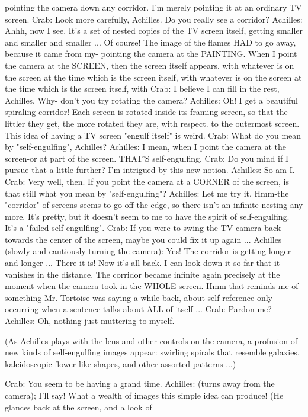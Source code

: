 {  pointing the camera down any corridor. I'm merely pointing it at an ordinary TV
  screen.
Crab: Look more carefully, Achilles. Do you really see a corridor?
Achilles: Ahhh, now I see. It's a set of nested copies of the TV screen itself, getting
  smaller and smaller and smaller ... Of course! The image of the flames HAD to go
  away, because it came from my- pointing the camera at the PAINTING. When I point
  the camera at the SCREEN, then the screen itself appears, with whatever is on the
  screen at the time which is the screen itself, with whatever is on the screen at the time
  which is the screen itself, with
Crab: I believe I can fill in the rest, Achilles. Why- don't you try rotating the camera?
Achilles: Oh! I get a beautiful spiraling corridor! Each screen is rotated inside its framing
  screen, so that the littler they get, the more rotated they are, with respect. to the
  outermost screen. This idea of having a TV screen "engulf itself" is weird.
Crab: What do you mean by "self-engulfing", Achilles?
Achilles: I mean, when I point the camera at the screen-or at part of the screen. THAT'S
  self-engulfing.
Crab: Do you mind if I pursue that a little further? I'm intrigued by this new notion.
Achilles: So am I.
Crab: Very well, then. If you point the camera at a CORNER of the screen, is that still
  what you mean by "self-engulfing"?
Achilles: Let me try it. Hmm-the "corridor" of screens seems to go off the edge, so there
  isn't an infinite nesting any more. It's pretty, but it doesn't seem to me to have the spirit
  of self-engulfing. It's a "failed self-engulfing".
Crab: If you were to swing the TV camera back towards the center of the screen, maybe
  you could fix it up again ...
Achilles (slowly and cautiously turning the camera): Yes! The corridor is getting longer
  and longer ... There it is! Now it's all back. I can look down it so far that it vanishes in
  the distance. The corridor became infinite again precisely at the moment when the
  camera took in the WHOLE screen. Hmm-that reminds me of something Mr. Tortoise
  was saying a while back, about self-reference only occurring when a sentence talks
  about ALL of itself ...
Crab: Pardon me?
Achilles: Oh, nothing just muttering to myself.

   (As Achilles plays with the lens and other controls on the camera, a profusion of new
   kinds of self-engulfing images appear: swirling spirals that resemble galaxies,
   kaleidoscopic flower-like shapes, and other assorted patterns ...)

Crab: You seem to be having a grand time.
Achilles: (turns away from the camera); I’ll say! What a wealth of images this simple
  idea can produce! (He glances back at the screen, and a look of




}
